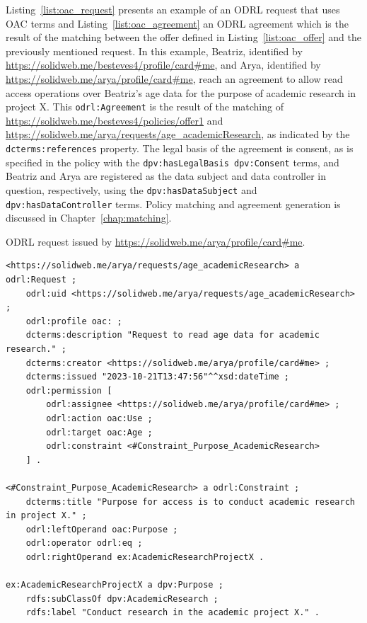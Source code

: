 Listing~\ref{list:oac_request} presents an example of an ODRL request that uses OAC terms and Listing~\ref{list:oac_agreement} an ODRL agreement which is the result of the matching between the offer defined in Listing~\ref{list:oac_offer} and the previously mentioned request.
In this example, Beatriz, identified by \url{https://solidweb.me/besteves4/profile/card#me}, and Arya, identified by \url{https://solidweb.me/arya/profile/card#me}, reach an agreement to allow read access operations over Beatriz's age data for the purpose of academic research in project X.
This \texttt{odrl:Agreement} is the result of the matching of \url{https://solidweb.me/besteves4/policies/offer1} and \url{https://solidweb.me/arya/requests/age_academicResearch}, as indicated by the \texttt{dcterms:references} property.
The legal basis of the agreement is consent, as is specified in the policy with the \texttt{dpv:hasLegalBasis dpv:Consent} terms, and Beatriz and Arya are registered as the data subject and data controller in question, respectively, using the \texttt{dpv:hasDataSubject} and \texttt{dpv:hasDataController} terms.
Policy matching and agreement generation is discussed in Chapter~\ref{chap:matching}.

\begin{listing}[ht]
\caption[ODRL Request.]{ODRL request issued by \url{https://solidweb.me/arya/profile/card\#me}.}
\label{list:oac_request}
\begin{verbatim}
<https://solidweb.me/arya/requests/age_academicResearch> a odrl:Request ;
    odrl:uid <https://solidweb.me/arya/requests/age_academicResearch> ;
    odrl:profile oac: ;
    dcterms:description "Request to read age data for academic research." ;
    dcterms:creator <https://solidweb.me/arya/profile/card#me> ;
    dcterms:issued "2023-10-21T13:47:56"^^xsd:dateTime ;
    odrl:permission [
        odrl:assignee <https://solidweb.me/arya/profile/card#me> ;
        odrl:action oac:Use ;
        odrl:target oac:Age ;
        odrl:constraint <#Constraint_Purpose_AcademicResearch>
    ] .

<#Constraint_Purpose_AcademicResearch> a odrl:Constraint ;
    dcterms:title "Purpose for access is to conduct academic research in project X." ;
    odrl:leftOperand oac:Purpose ;
    odrl:operator odrl:eq ;
    odrl:rightOperand ex:AcademicResearchProjectX .

ex:AcademicResearchProjectX a dpv:Purpose ;
    rdfs:subClassOf dpv:AcademicResearch ;
    rdfs:label "Conduct research in the academic project X." .
\end{verbatim}
\end{listing}


